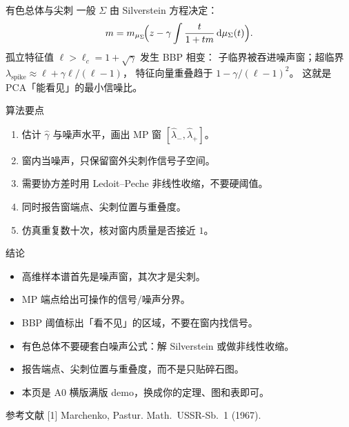 \documentclass[UTF8,fontset=none]{ctexart}
\begin{document}
\begin{postercolumns}
\begin{postercolumn}
\posterblockgap

\begin{posterblock}{有色总体与尖刺}
  一般 $\Sigma$ 由 Silverstein 方程决定：
  \[
    m=m_{\mu_\Sigma}\!\Bigl(z-\gamma\int\frac{t}{1+tm}\,\mathrm{d}\mu_\Sigma(t)\Bigr).
  \]
  孤立特征值 $\ell>\ell_c=1+\sqrt{\gamma}$ 发生 \textcolor{rppine}{BBP 相变}：
  子临界被吞进噪声窗；超临界
  $\lambda_{\mathrm{spike}}\approx \ell+\gamma\ell/(\ell-1)$，
  特征向量重叠趋于 $1-\gamma/(\ell-1)^2$。
  这就是 PCA「能看见」的最小信噪比。
\end{posterblock}
\end{postercolumn}

\begin{postercolumn}

\begin{posterblock}{算法要点}
  \begin{enumerate}
    \item 估计 $\hat\gamma$ 与噪声水平，画出 MP 窗 $[\hat\lambda_-,\hat\lambda_+]$。
    \item 窗内当噪声，只保留窗外尖刺作信号子空间。
    \item 需要协方差时用 Ledoit--Peche 非线性收缩，不要硬阈值。
    \item 同时报告窗端点、尖刺位置与重叠度。
    \item 仿真重复数十次，核对窗内质量是否接近 $1$。
  \end{enumerate}
\end{posterblock}

\posterblockgap

\begin{posterblock}[posterfeature]{结论}
  \begin{itemize}
    \item 高维样本谱首先是噪声窗，其次才是尖刺。
    \item MP 端点给出可操作的信号/噪声分界。
    \item BBP 阈值标出「看不见」的区域，不要在窗内找信号。
    \item 有色总体不要硬套白噪声公式：解 Silverstein 或做非线性收缩。
    \item 报告端点、尖刺位置与重叠度，而不是只贴碎石图。
    \item 本页是 A0 横版满版 demo，换成你的定理、图和表即可。
  \end{itemize}
\end{posterblock}

\posterblockgap

\begin{posterblock}[posterquiet]{参考文献}
  [1] Marchenko, Pastur. Math.\ USSR-Sb.\ 1 (1967).


\end{posterblock}
\end{postercolumn}
\end{postercolumns}
\end{document}
